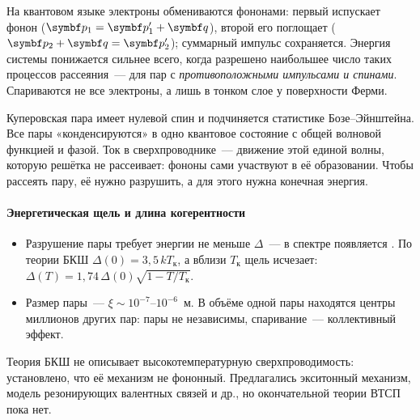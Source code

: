 На квантовом языке электроны обмениваются фононами: первый испускает
фонон ($\vb p_1=\vb p_1'+\vb q$), второй его поглощает
($\vb p_2+\vb q=\vb p_2'$); суммарный импульс сохраняется. Энергия системы
понижается сильнее всего, когда разрешено наибольшее число таких
процессов рассеяния~— для пар с \emph{противоположными импульсами и
спинами}. Спариваются не все электроны, а лишь в тонком слое у
поверхности Ферми.

\begin{glavnoe}
Куперовская пара имеет нулевой спин и подчиняется статистике
Бозе--Эйнштейна. Все пары «конденсируются» в одно квантовое состояние с
общей волновой функцией и фазой. Ток в сверхпроводнике~— движение этой
единой волны, которую решётка не рассеивает: фононы сами участвуют в
её образовании. Чтобы рассеять пару, её нужно разрушить, а для этого
нужна конечная энергия.
\end{glavnoe}

\paragraph{Энергетическая щель и длина когерентности}
\begin{itemize}
\item Разрушение пары требует энергии не меньше $\Delta$~— в спектре
появляется . По теории БКШ
$\Delta(0)=3{,}5\,kT_\text{к}$, а вблизи $T_\text{к}$ щель исчезает:
$\Delta(T)=1{,}74\,\Delta(0)\sqrt{1-T/T_\text{к}}$.
\item Размер пары~—  $\xi\sim10^{-7}$--$10^{-6}$~м.
В объёме одной пары находятся центры миллионов других пар: пары не
независимы, спаривание~— коллективный эффект.
\end{itemize}
Теория БКШ не описывает высокотемпературную сверхпроводимость:
установлено, что её механизм не фононный. Предлагались экситонный
механизм, модель резонирующих валентных связей и др., но окончательной
теории ВТСП пока нет.

